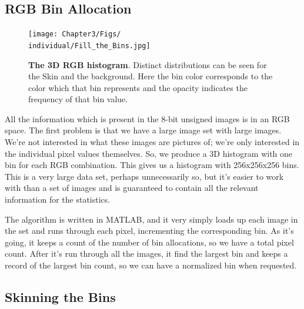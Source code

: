 

\subsection{RGB Bin Allocation}\label{sec:RGBBinAllocation}


\def\individual{FSkin}


\begin{figure}[h!]
  \centering
    \texttt{[image: Chapter3/Figs/\\individual/Fill\_the\_Bins.jpg]}
        \caption{\textbf{The 3D RGB histogram}. Distinct distributions can be seen for the Skin and the background. Here the bin color corresponds to the color which that bin represents and the opacity indicates the frequency of that bin value. }  \label{fig:Fill_the_Bins}
    \end{figure}

All the information which is present in the 8-bit unsigned images is in an RGB space. The first problem is that we have a large image set with large images. We're not interested in what these images are pictures of; we're only interested in the individual pixel values themselves. So, we produce a 3D histogram with one bin for each RGB combination. This gives us a histogram with 256x256x256 bins. This is a very large data set, perhaps unnecessarily so, but it's easier to work with than a set of images and is guaranteed to contain all the relevant information for the statistics.


The algorithm is written in MATLAB, and it very simply loads up each image in the set and runs through each pixel, incrementing the corresponding bin. As it's going, it keeps a count of the number of bin allocations, so we have a total pixel count. After it's run through all the images, it find the largest bin and keeps a record of the largest bin count, so we can have a normalized bin when requested.


\subsection{Skinning the Bins}\label{sec:SkinningTheBins}

